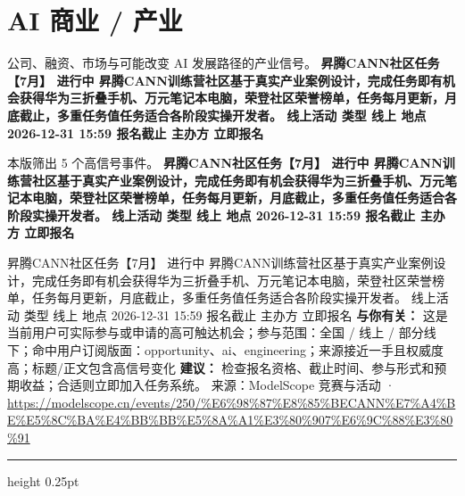 \documentclass[10.5pt]{ctexart}
\begin{document}
\section*{AI 商业 / 产业}
{\color{ormuted} 公司、融资、市场与可能改变 AI 发展路径的产业信号。}
\vspace{2mm}
{\LARGE\bfseries 昇腾CANN社区任务【7月】 进行中 昇腾CANN训练营社区基于真实产业案例设计，完成任务即有机会获得华为三折叠手机、万元笔记本电脑，荣登社区荣誉榜单，任务每月更新，月底截止，多重任务值任务适合各阶段实操开发者。 线上活动 类型 线上 地点 2026-12-31 15:59 报名截止 主办方 立即报名}\par
\vspace{1mm}
{\color{ormuted} 本版筛出 5 个高信号事件。}
\vspace{3mm}
{\Large\bfseries 昇腾CANN社区任务【7月】 进行中 昇腾CANN训练营社区基于真实产业案例设计，完成任务即有机会获得华为三折叠手机、万元笔记本电脑，荣登社区荣誉榜单，任务每月更新，月底截止，多重任务值任务适合各阶段实操开发者。 线上活动 类型 线上 地点 2026-12-31 15:59 报名截止 主办方 立即报名}\par
昇腾CANN社区任务【7月】 进行中 昇腾CANN训练营社区基于真实产业案例设计，完成任务即有机会获得华为三折叠手机、万元笔记本电脑，荣登社区荣誉榜单，任务每月更新，月底截止，多重任务值任务适合各阶段实操开发者。 线上活动 类型 线上 地点 2026-12-31 15:59 报名截止 主办方 立即报名
\textbf{与你有关：} 这是当前用户可实际参与或申请的高可触达机会；参与范围：全国 / 线上 / 部分线下；命中用户订阅版面：opportunity、ai、engineering；来源接近一手且权威度高；标题/正文包含高信号变化
\textbf{建议：} 检查报名资格、截止时间、参与形式和预期收益；合适则立即加入任务系统。
{\footnotesize\color{ormuted} 来源：ModelScope 竞赛与活动 · \url{https://modelscope.cn/events/250/%E6%98%87%E8%85%BECANN%E7%A4%BE%E5%8C%BA%E4%BB%BB%E5%8A%A1%E3%80%907%E6%9C%88%E3%80%91}}
\vspace{4mm}
\hrule height 0.25pt
\vspace{3mm}
\end{document}
